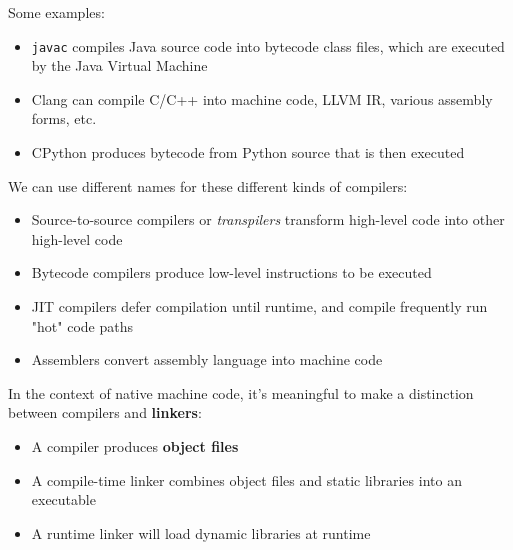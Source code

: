 \documentclass[../index.tex]{subfiles}
\begin{document}
\begin{frame}[fragile]{\currenttitle}
  Some examples:

  \begin{itemize}
    \item<+-> \texttt{javac} compiles Java source code into bytecode class
      files, which are executed by the Java Virtual Machine
    \item<+-> Clang can compile C/C++ into machine code, LLVM IR,
      various assembly forms, etc.
    \item<+-> CPython produces bytecode from Python source that is then
      executed
  \end{itemize}
\end{frame}

\begin{frame}[fragile]{\currenttitle}
  We can use different names for these different kinds of compilers:

  \begin{itemize}
    \item<+-> Source-to-source compilers or \textit{transpilers} transform
      high-level code into other high-level code
    \item<+-> Bytecode compilers produce low-level instructions to be executed
    \item<+-> JIT compilers defer compilation until runtime, and compile
      frequently run "hot" code paths
    \item<+-> Assemblers convert assembly language into machine code
  \end{itemize}
\end{frame}

\begin{frame}[fragile]{\currenttitle}
  In the context of native machine code, it's meaningful to make a distinction
  between compilers and \textbf{linkers}:

  \begin{itemize}
    \item<2-> A compiler produces \textbf{object files}
    \item<3-> A compile-time linker combines object files and static
      libraries into an executable
    \item<4-> A runtime linker will load dynamic libraries at runtime
  \end{itemize}

\end{frame}
\end{document}
